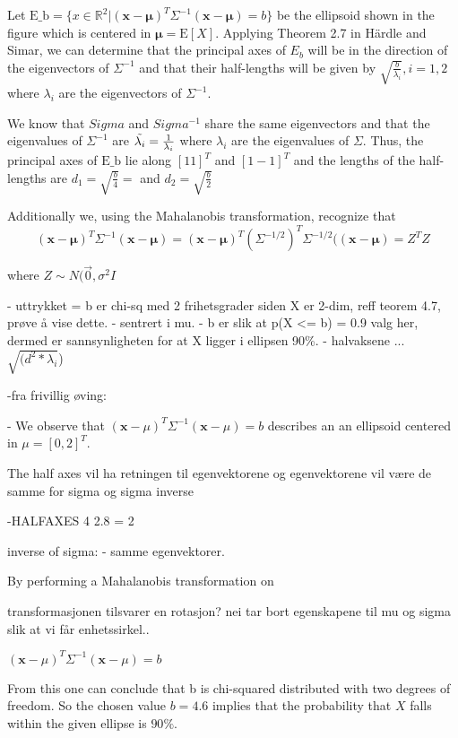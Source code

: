 Let $\text{E_b} = \{ x \in \mathbb{R}^2|(\mathbf{x}- \mathbf{\mu})^T\Sigma^{-1} (\mathbf{x}- \mathbf{\mu}) = b \}$ be the ellipsoid shown in the figure which is centered in $\mathbf{\mu}=\text{E}[X]$. Applying Theorem 2.7 in Härdle and Simar, we can determine that the principal axes of $E_b$ will be in the direction of the eigenvectors of $\Sigma^{-1}$ and that their half-lengths will be given by $\sqrt{\frac{b}{\lambda_i}}, i =1,2$ where $\lambda_i$ are the eigenvectors of $\Sigma^{-1}$.  

We know that $Sigma$ and $Sigma^{-1}$ share the same eigenvectors and that the eigenvalues of $\Sigma^{-1}$ are  $\Tilde{\lambda_i}= \frac{1}{{\lambda_i}}$ where $\lambda_i$ are the eigenvalues of $\Sigma$. Thus, the principal axes of $\text{E_b}$ lie along $[1 1]^T$ and $[1 -1]^T$ and the lengths of the half-lengths are $d_1 = \sqrt{\frac{b}{4}} =$ and $d_2 =\sqrt{\frac{b}{2}}$ %

Additionally we, using the Mahalanobis transformation, recognize that 
\begin{equation*}
    (\mathbf{x}- \mathbf{\mu})^T\Sigma^{-1} (\mathbf{x}- \mathbf{\mu})
    = (\mathbf{x}- \mathbf{\mu})^T(\Sigma^{-1/2})^T\Sigma^{-1/2}((\mathbf{x}- \mathbf{\mu}) = Z^TZ
\end{equation*}

where $Z \sim N(\Vec{0}, \sigma^2 I $

- uttrykket = b er chi-sq med 2 frihetsgrader siden X er 2-dim, reff teorem 4.7, prøve å vise dette. 
- sentrert i mu.
- b er slik at p(X <= b) = 0.9 valg her, dermed er sannsynligheten for at X ligger i ellipsen 90\%. 
- halvaksene ... $\sqrt{(d^2 * \lambda_i}$) 


-fra frivillig øving: 

- 
We observe that $(\textbf{x}- {\mu})^T \Sigma^{-1} (\textbf{x}-{\mu})=b$ describes an an ellipsoid centered in $\mu = [0, 2]^T$. 

The half axes vil ha retningen til egenvektorene og 
egenvektorene vil være de samme for sigma og sigma inverse 

-HALFAXES
4
2.8 = 2

inverse of sigma:
- samme egenvektorer.

By performing a Mahalanobis transformation on 

transformasjonen tilsvarer en rotasjon?
nei tar bort egenskapene til mu og sigma slik at vi får enhetssirkel..

$(\textbf{x}- {\mu})^T \Sigma^{-1} (\textbf{x}-{\mu})=b$ %

From this one can conclude that b is chi-squared distributed with two degrees of freedom. So the chosen value $b=4.6$ implies that the probability that $X$ falls within the given ellipse is $90\%$. 